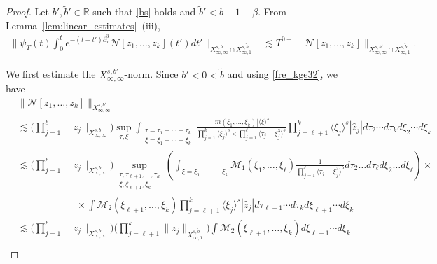 \documentclass[a4paper,
11pt,  reqno]{amsart}
\newcommand{\jap}[1]{\langle #1 \rangle}
\newcommand{\5}{\textup{V}}
\newcommand{\ft}{\widehat}
\newcommand{\les}{\lesssim}
\newcommand{\wt}{\widetilde}
\theoremstyle{remark}
\newcommand{\R}{\mathbb{R}}
\newcommand{\be}{\beta}
\renewcommand{\l}{\ell}
\numberwithin{equation}{section}
\numberwithin{theorem}{section}
\newcommand{\Ncal}{\mathcal{N}}
\begin{document}
		\begin{proof}

        Let $b', \wt b' \in \R$ such that \eqref{bs} holds
        {and $\wt b' < b - 1 - \be$.}
        From Lemma~\ref{lem:linear_estimates}~(iii), 
        \begin{align}
            \bigg\|\psi_T (t)\int_0^t e^{-(t-t')\partial_x^3}\Ncal[z_1,\ldots, z_k](t')dt' \bigg\|_{X^{s,b}_{\infty, \infty} \cap X^{s, \wt b}_{\infty, 1}} 
            & 
            \les T^{0+} \| \Ncal[z_1, \ldots, z_k] \|_{X^{s, b'}_{\infty, \infty} \cap X^{s, \wt b '}_{\infty, 1} } . 
        \end{align}


        We first estimate the $X^{s, b'}_{\infty, \infty}$-norm. Since $b'<0<\wt b$ and using \eqref{fre_kge32}, we have
\begin{align*}
				&\|\Ncal[z_1,\dots, z_k] \|_{X^{s,b'}_{\infty, \infty}} 
                \\
                & \les 
                \bigg(\prod_{j=1}^\ell \|z_j\|_{X_{\infty,\infty}^{s,b}}
                \bigg)
                \sup_{\tau, \xi} \int_{\substack{\tau=\tau_1 + \cdots + \tau_k \\ \xi = \xi_1 + \cdots + \xi_k}} \frac{|m(\xi_1, \ldots, \xi_k)|\jap{\xi}^s}{\prod_{j=1}^k\jap{\xi_j}^s \times \prod_{j=1}^\ell \jap{\tau_j-\xi_j^3}^b}\prod_{j=\ell+1}^k \jap{\xi_j}^s|\ft{z}_j| d\tau_2\cdots d\tau_k d\xi_2 \cdots d\xi_k
				\\
                &\les 
                \bigg(\prod_{j=1}^\ell \|z_j\|_{X_{\infty,\infty}^{s,b}}
                \bigg)
                \sup_{\substack{\tau, \tau_{\ell+1},\dots,\tau_k\\ \xi, \xi_{\ell+1}, \xi_k}} \left(\int_{\xi=\xi_1+\cdots+\xi_k} \mathcal{M}_1(\xi_1, \ldots, \xi_\l) \frac{1}{\prod_{j=1}^\ell \jap{\tau_j-\xi_j^3}^b}d\tau_2\dots d\tau_\ell d\xi_2\dots d\xi_\ell\right) \times
                \\ & \qquad \qquad \qquad \times \int \mathcal{M}_2(\xi_{\l+1}, \ldots, \xi_k) \prod_{j=\ell+1}^k \jap{\xi_j}^s|\ft{z}_j| d\tau_{\ell+1}\cdots d\tau_k d\xi_{\ell+1} \cdots d\xi_k
				\\
                &
                \les 
                \bigg(\prod_{j=1}^\ell \|z_j\|_{X_{\infty,\infty}^{s,b}}
                \bigg) 
                \bigg( \prod_{j=\l+1}^k \|z_j\|_{X^{s, \wt b}_{\infty, 1}} \bigg)
                \int  \mathcal{M}_2 (\xi_{\l+1}, \ldots, \xi_k) 
                d\xi_{\l+1} \cdots d\xi_{k}
				\\

\end{align*}
\end{proof}
\end{document}
